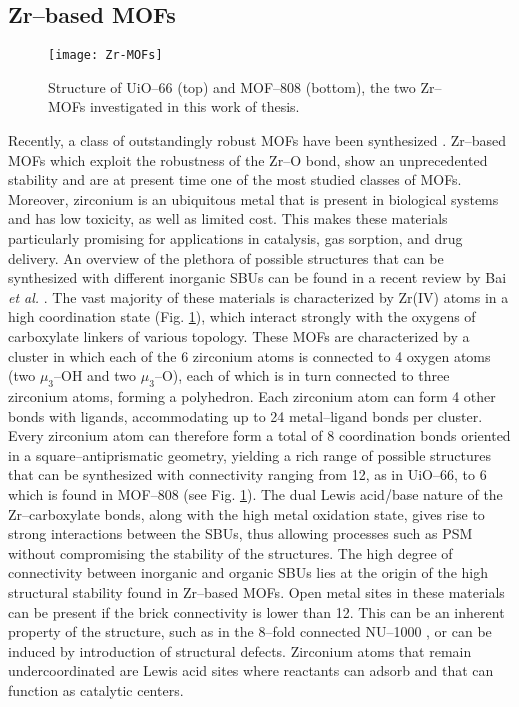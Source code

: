 \subsection*{Zr--based MOFs}
\begin{figure}[!htbp]
	\centering
 	\texttt{[image: Zr-MOFs]}
	\caption{Structure of UiO--66 (top) and MOF--808 (bottom), the two Zr--MOFs investigated in this work of thesis.}
	\label{fig:Zr-MOFs}
\end{figure}
Recently, a class of outstandingly robust MOFs have been synthesized \cite{furukawa2014water}. Zr--based MOFs\cite{bai2016zr} which exploit the robustness of the Zr--O bond, show an unprecedented stability and are at present time one of the most studied classes of MOFs. Moreover, zirconium is an ubiquitous metal that is present in biological systems and has low toxicity, as well as limited cost. This makes these materials particularly promising for applications in catalysis, gas sorption, and drug delivery. An overview of the plethora of possible structures that can be synthesized with different inorganic SBUs can be found in a recent review by Bai \textit{et al.} \cite{bai2016zr}.
\npar
The vast majority of these materials is characterized by Zr(IV) atoms in a high coordination state (Fig. \ref{fig:Zr-MOFs}), which interact strongly with the oxygens of carboxylate linkers of various topology. These MOFs are characterized by a  cluster in which each of the 6 zirconium atoms is connected to 4 oxygen atoms (two $\mu_3$--OH and two $\mu_3$--O), each of which is in turn connected to three zirconium atoms, forming a polyhedron. Each zirconium atom can form 4 other bonds with ligands, accommodating up to 24 metal--ligand bonds per cluster. Every zirconium atom can therefore form a total of 8 coordination bonds oriented in a square--antiprismatic geometry, yielding a rich range of possible structures that can be synthesized with connectivity ranging from 12, as in UiO--66\cite{cavka2008new}, to 6 which is found in MOF--808\cite{furukawa2014water} (see Fig. \ref{fig:Zr-MOFs}). The dual Lewis acid/base nature of the Zr--carboxylate bonds, along with the high metal oxidation state, gives rise to strong interactions between the SBUs, thus allowing processes such as PSM without compromising the stability of the structures. The high degree of connectivity between inorganic and organic SBUs lies at the origin of the high structural stability found in Zr--based MOFs\cite{bai2016zr, leus2016systematic}. Open metal sites in these materials can be present if the brick connectivity is lower than 12. This can be an inherent property of the structure, such as in the 8--fold connected NU--1000 \cite{mondloch2013vapor}, or can be induced by introduction of structural defects. Zirconium atoms that remain undercoordinated are Lewis acid sites where reactants can adsorb and that can function as catalytic centers.

